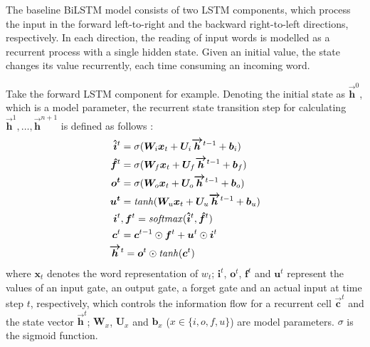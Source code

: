 \documentclass[11pt,a4paper]{article}
\begin{document}
The baseline BiLSTM model consists of two LSTM components, which process the input in the forward left-to-right and the backward right-to-left directions, respectively. 
In each direction, the reading of input words is modelled as a recurrent process with a single hidden state. 
Given an initial value, the state changes its value recurrently, each time consuming an incoming word.


Take the forward LSTM component for example. Denoting the initial state as $\boldsymbol{\overrightarrow{h}}^0$, which is a model parameter, the recurrent state transition step for calculating $\boldsymbol{\overrightarrow{h}}^1,\dots,\boldsymbol{\overrightarrow{h}}^{n+1}$ is defined as follows \cite{graves2005framewise}:
\begin{equation} \label{eq:gate_bilstm}
\begin{split}
\boldsymbol{\hat{i}}^t &= \sigma(\boldsymbol{W}_i \boldsymbol{x}_t + \boldsymbol{U}_i \boldsymbol{\overrightarrow{h}}^{t-1} + \boldsymbol{b}_i) \\
\boldsymbol{\hat{f}}^t &= \sigma(\boldsymbol{W}_f \boldsymbol{x}_t + \boldsymbol{U}_f \boldsymbol{\overrightarrow{h}}^{t-1} + \boldsymbol{b}_f) \\
\boldsymbol{o^t} &= \sigma(\boldsymbol{W}_o \boldsymbol{x}_t + \boldsymbol{U}_o \boldsymbol{\overrightarrow{h}}^{t-1} + \boldsymbol{b}_o) \\
\boldsymbol{u^t} &= {\it tanh}(\boldsymbol{W}_u \boldsymbol{x}_t + \boldsymbol{U}_u \boldsymbol{\overrightarrow{h}}^{t-1} + \boldsymbol{b}_u) \\
\boldsymbol{i}^t&, \boldsymbol{f}^t = {\it softmax}(\boldsymbol{\hat{i}}^t,\boldsymbol{\hat{f}}^t) \\
\boldsymbol{c}^t &= \boldsymbol{c}^{t-1} \odot \boldsymbol{f}^t + \boldsymbol{u}^t \odot \boldsymbol{i}^t \\
\boldsymbol{\overrightarrow{h}}&^t = \boldsymbol{o}^t \odot {\it tanh}(\boldsymbol{c}^t)
\end{split}
\end{equation}
where $\boldsymbol{x}_t$ denotes the word representation of $w_t$; $\boldsymbol{i}^t$, $\boldsymbol{o}^t$, $\boldsymbol{f}^t$ and $\boldsymbol{u}^t$ represent the values of an input gate, an output gate, a forget gate and an actual input at time step $t$, respectively, which controls the information flow for a recurrent cell $\boldsymbol{\overrightarrow{c}}^t$ and the state vector $\boldsymbol{\overrightarrow{h}}^t$; $\boldsymbol{W}_x$, $\boldsymbol{U}_x$ and $\boldsymbol{b}_x$ ($x \in \{i,o,f,u\}$) are model parameters.
$\sigma$ is the sigmoid function.
\end{document}

